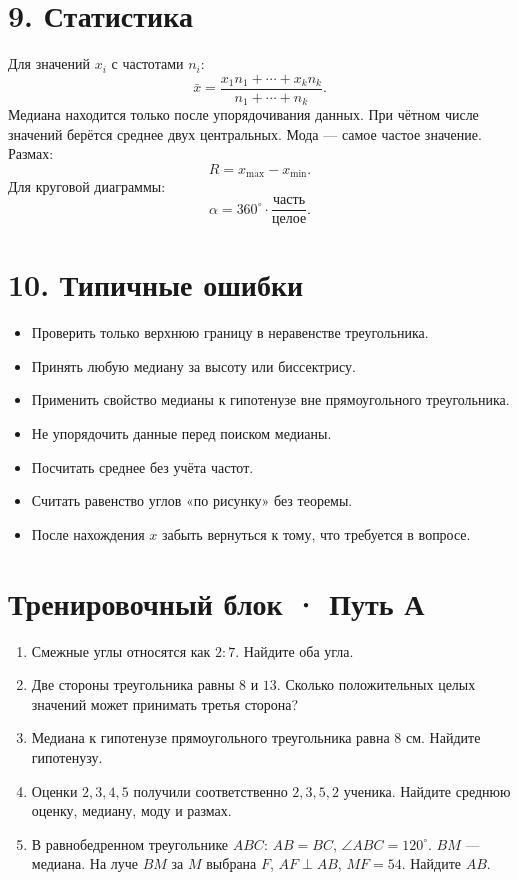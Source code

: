 \documentclass[a4paper,12pt]{article}
\begin{document}
\section*{\color{darkaccent}9. Статистика}
Для значений $x_i$ с частотами $n_i$:
\[
\bar x=\frac{x_1n_1+\cdots+x_kn_k}{n_1+\cdots+n_k}.
\]
Медиана находится только после упорядочивания данных. При чётном числе значений берётся среднее двух центральных. Мода --- самое частое значение. Размах:
\[
R=x_{\max}-x_{\min}.
\]
Для круговой диаграммы:
\[
\alpha=360^\circ\cdot\frac{\text{часть}}{\text{целое}}.
\]

\section*{\color{darkaccent}10. Типичные ошибки}
\begin{itemize}
\item Проверить только верхнюю границу в неравенстве треугольника.
\item Принять любую медиану за высоту или биссектрису.
\item Применить свойство медианы к гипотенузе вне прямоугольного треугольника.
\item Не упорядочить данные перед поиском медианы.
\item Посчитать среднее без учёта частот.
\item Считать равенство углов «по рисунку» без теоремы.
\item После нахождения $x$ забыть вернуться к тому, что требуется в вопросе.
\end{itemize}

\clearpage
\section*{\color{darkaccent}Тренировочный блок · Путь А}
\begin{enumerate}
\item Смежные углы относятся как $2:7$. Найдите оба угла.
\item Две стороны треугольника равны $8$ и $13$. Сколько положительных целых значений может принимать третья сторона?
\item Медиана к гипотенузе прямоугольного треугольника равна $8$ см. Найдите гипотенузу.
\item Оценки $2,3,4,5$ получили соответственно $2,3,5,2$ ученика. Найдите среднюю оценку, медиану, моду и размах.
\item В равнобедренном треугольнике $ABC$: $AB=BC$, $\angle ABC=120^\circ$. $BM$ --- медиана. На луче $BM$ за $M$ выбрана $F$, $AF\perp AB$, $MF=54$. Найдите $AB$.
\end{enumerate}
\end{document}
